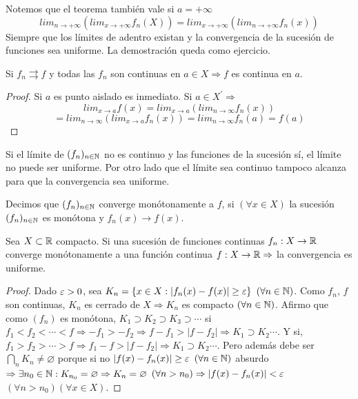 Notemos que el teorema también vale si $a = +\infty$
\begin{equation}
  lim_{n \to +\infty} (lim_{x \to +\infty} f_n(X)) = lim_{x \to +\infty}(lim_{n \to +\infty} f_n(x))
\end{equation} Siempre que los límites de adentro existan y la convergencia de la sucesión de funciones sea uniforme. La demostración queda como ejercicio.

\begin{theorem}
  Si $f_n \rightrightarrows f$ y todas las $f_n$ son continuas en $a \in X \Rightarrow f$ es continua en $a$.
  \begin{proof}
    Si $a$ es punto aislado es inmediato. Si $a \in X^{\prime} \Rightarrow$ \begin{equation}
      lim_{x \to a} f(x) = lim_{x \to a}(lim_{n \to \infty} f_n(x)) 
    \end{equation}
    \begin{equation}
      = lim_{n \to \infty}(lim_{x \to a} f_n(x)) = lim_{n \to \infty} f_n(a) = f(a)
    \end{equation}
  \end{proof}
\end{theorem}

Si el límite de $(f_n)_{n \in \mathbb{N}}$ no es continuo y las funciones de la sucesión sí, el límite no puede ser uniforme. Por otro lado que el límite sea continuo tampoco alcanza para que la convergencia sea uniforme.

\begin{definition}
  Decimos que $(f_n)_{n \in \mathbb{N}}$ converge monótonamente a $f$, si $(\forall x \in X)$ la sucesión $(f_n)_{n \in \mathbb{N}}$ es monótona y $f_n(x) \to f(x)$.
\end{definition}

\begin{theorem}
  Sea $X \subset \mathbb{R}$ compacto. Si una sucesión de funciones continuas $f_n: X \to \mathbb{R}$ converge monótonamente a una función continua $f: X \to \mathbb{R} \Rightarrow$ la convergencia es uniforme.
  \begin{proof}
    Dado $\varepsilon > 0$, sea $K_n = \{ x \in X : |f_n(x) - f(x)| \geq \varepsilon \}$ $(\forall n \in \mathbb{N})$. Como $f_n$, $f$ son continuas, $K_n$ es cerrado de $X \Rightarrow K_n$ es compacto $(\forall n \in \mathbb{N})$. Afirmo que como $(f_n)$ es monótona, $K_1 \supset K_2 \supset K_3 \supset \cdots$ si $f_1 < f_2 < \cdots < f \Rightarrow -f_1 > -f_2 \Rightarrow f - f_1 > |f - f_2| \Rightarrow K_1 \supset K_2 \cdots$. Y si, $f_1 > f_2 > \cdots > f \Rightarrow f_1 - f > |f - f_2| \Rightarrow K_1 \supset K_2 \cdots$. Pero además debe ser $\bigcap_n K_n \neq \varnothing$ porque si no $|f(x) - f_n(x)| \geq \varepsilon$ $(\forall n \in \mathbb{N})$ absurdo $\Rightarrow \exists n_0 \in \mathbb{N} : K_{n_0} = \varnothing \Rightarrow K_n = \varnothing$ $(\forall n > n_0) \Rightarrow |f(x) - f_n(x)| < \varepsilon$ $(\forall n > n_0)(\forall x \in X)$.
  \end{proof}
\end{theorem}

